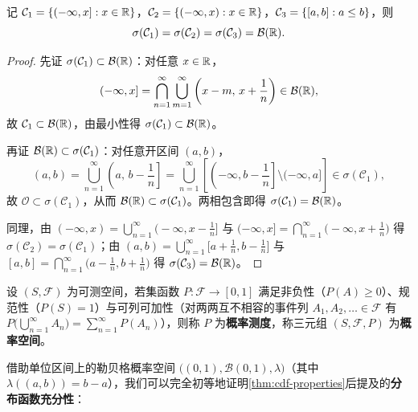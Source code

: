 \begin{proposition}
\label{prop:borel-generators}
记 $\mathcal{C}_1=\{(-\infty,x]:x\in\mathbb{R}\}$，$\mathcal{C}_2=\{(-\infty,x):x\in\mathbb{R}\}$，$\mathcal{C}_3=\{[a,b]:a\le b\}$，则
\[
  \sigma(\mathcal{C}_1)=\sigma(\mathcal{C}_2)=\sigma(\mathcal{C}_3)=\mathcal{B}(\mathbb{R}).
\]
\end{proposition}
\begin{proof}
先证 $\sigma(\mathcal{C}_1)\subset\mathcal{B}(\mathbb{R})$：对任意 $x\in\mathbb{R}$，
\[
  (-\infty,x]=\bigcap_{n=1}^{\infty}\bigcup_{m=1}^{\infty}\left(x-m,\,x+\frac{1}{n}\right)\in\mathcal{B}(\mathbb{R}),
\]
故 $\mathcal{C}_1\subset\mathcal{B}(\mathbb{R})$，由最小性得 $\sigma(\mathcal{C}_1)\subset\mathcal{B}(\mathbb{R})$。

再证 $\mathcal{B}(\mathbb{R})\subset\sigma(\mathcal{C}_1)$：对任意开区间 $(a,b)$，
\[
  (a,b)=\bigcup_{n=1}^{\infty}\left(a,\,b-\frac{1}{n}\right]
  =\bigcup_{n=1}^{\infty}\left[\left(-\infty,b-\frac{1}{n}\right]\setminus(-\infty,a]\right]\in\sigma(\mathcal{C}_1),
\]
故 $\mathcal{O}\subset\sigma(\mathcal{C}_1)$，从而 $\mathcal{B}(\mathbb{R})\subset\sigma(\mathcal{C}_1)$。两相包含即得 $\sigma(\mathcal{C}_1)=\mathcal{B}(\mathbb{R})$。

同理，由 $(-\infty,x)=\bigcup_{n=1}^{\infty}\bigl(-\infty,x-\frac{1}{n}\bigr]$ 与 $(-\infty,x]=\bigcap_{n=1}^{\infty}\bigl(-\infty,x+\frac{1}{n}\bigr)$ 得 $\sigma(\mathcal{C}_2)=\sigma(\mathcal{C}_1)$；由 $(a,b)=\bigcup_{n=1}^{\infty}\bigl[a+\frac{1}{n},b-\frac{1}{n}\bigr]$ 与 $[a,b]=\bigcap_{n=1}^{\infty}\bigl(a-\frac{1}{n},b+\frac{1}{n}\bigr)$ 得 $\sigma(\mathcal{C}_3)=\mathcal{B}(\mathbb{R})$。
\end{proof}

\begin{definition}[概率空间]
\label{def:prob-space}
设 $(S,\mathcal{F})$ 为可测空间，若集函数 $P:\mathcal{F}\to[0,1]$ 满足非负性（$P(A)\ge 0$）、规范性（$P(S)=1$）与可列可加性（对两两互不相容的事件列 $A_1,A_2,\ldots\in\mathcal{F}$ 有 $P\bigl(\bigcup_{n=1}^{\infty}A_n\bigr)=\sum_{n=1}^{\infty}P(A_n)$），则称 $P$ 为\textbf{概率测度}，称三元组 $(S,\mathcal{F},P)$ 为\textbf{概率空间}。
\end{definition}

借助单位区间上的勒贝格概率空间 $\bigl((0,1),\mathcal{B}(0,1),\lambda\bigr)$（其中 $\lambda((a,b))=b-a$），我们可以完全初等地证明\cref{thm:cdf-properties}后提及的\textbf{分布函数充分性}：

